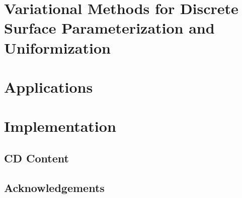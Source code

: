 \documentclass[a4paper]{book}
\def\mainbibliography {
	\backmatter
	\setcounter{secnumdepth}{-1} 
	
	
}
\begin{document}
\newpage

\tableofcontents
\newpage

\newpage
\mainmatter
\setcounter{secnumdepth}{-1} 

\setcounter{secnumdepth}{2}
\part{Variational Methods for Discrete Surface Parameterization and Uniformization} 
\label{part:uniformization}





\part{Applications}
\label{part:applications}



\part{Implementation}
\label{part:implementation}





\newpage 
\mainbibliography

\backmatter
\appendix
\chapter{CD Content}
\label{chp:cd_content}

\chapter{Acknowledgements}
\end{document}
